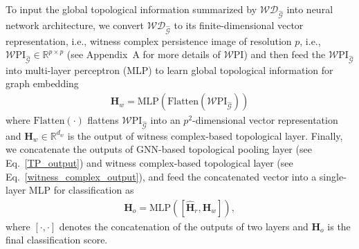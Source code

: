 \documentclass[letterpaper]{article} %
\begin{document}
To input the global topological information summarized by $\mathcal{WD}_{\mathcal{\hat{G}}}$ into neural network architecture, we convert $\mathcal{WD}_{\mathcal{\hat{G}}}$ to its finite-dimensional vector representation, i.e., witness complex persistence image of resolution $p$, i.e., $\mathcal{W}\text{PI}_{\mathcal{\hat{G}}}\in \mathbb{R}^{p \times p}$ (see Appendix~A for more details of $\mathcal{W}\text{PI}$) and then feed the $\mathcal{W}\text{PI}_{\mathcal{\hat{G}}}$ into multi-layer perceptron (MLP) to learn global topological information for graph embedding 
\begin{align}
\label{witness_complex_output}
    \boldsymbol{H}_w = \text{MLP}(\text{Flatten}(\mathcal{W}\text{PI}_\mathcal{\hat{G}}))
\end{align}
where $\text{Flatten}(\cdot)$ flattens %
$\mathcal{W}\text{PI}_{\mathcal{\hat{G}}}$ into an $p^2$-dimensional vector representation and $\boldsymbol{H}_w \in \mathbb{R}^{d_w}$ is the output of witness complex-based topological layer. Finally, we concatenate the outputs of GNN-based topological pooling layer (see Eq.~\ref{TP_output}) and witness complex-based topological layer (see Eq.~\ref{witness_complex_output}), and feed the concatenated vector into a single-layer MLP for classification as
\begin{align*}
    \boldsymbol{H}_o = \text{MLP}([\boldsymbol{\hat{H}}_r, \boldsymbol{H}_w]),
\end{align*}
where $[\cdot,\cdot]$ denotes the concatenation of the outputs of two layers and $\boldsymbol{H}_o$ is the final classification score.
\end{document}
